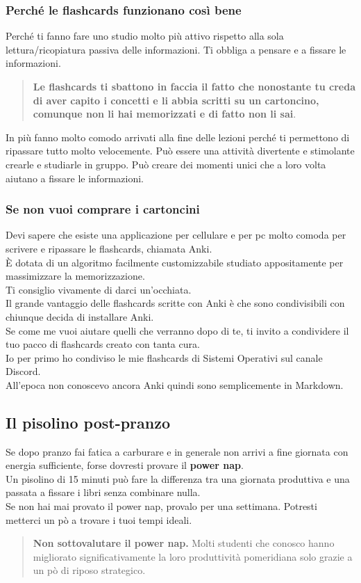 \documentclass[18pt]{extarticle}
\begin{document}
\subsubsection{Perché le flashcards funzionano così bene}
Perché ti fanno fare uno studio molto più attivo rispetto alla sola lettura/ricopiatura passiva delle informazioni.  
Ti obbliga a pensare e a fissare le informazioni.
\begin{quote}
\textbf{Le flashcards ti sbattono in faccia il fatto che nonostante tu creda di aver capito i concetti e li abbia scritti su un cartoncino, comunque non li hai memorizzati e di fatto non li sai}. 
\end{quote}
In più fanno molto comodo arrivati alla fine delle lezioni perché ti permettono di ripassare tutto molto velocemente.  
Può essere una attività divertente e stimolante crearle e studiarle in gruppo.  
Può creare dei momenti unici che a loro volta aiutano a fissare le informazioni. 


\subsubsection{Se non vuoi comprare i cartoncini}
Devi sapere che esiste una applicazione per cellulare e per pc molto comoda per scrivere e ripassare le flashcards, chiamata Anki.\\
È dotata di un algoritmo facilmente customizzabile studiato appositamente per massimizzare la memorizzazione.\\
Ti consiglio vivamente di darci un'occhiata.\\
Il grande vantaggio delle flashcards scritte con Anki è che sono condivisibili con chiunque decida di installare Anki.\\
Se come me vuoi aiutare quelli che verranno dopo di te, ti invito a condividere il tuo pacco di flashcards creato con tanta cura.\\
Io per primo ho condiviso le mie flashcards di Sistemi Operativi sul canale Discord.\\
All'epoca non conoscevo ancora Anki quindi sono semplicemente in Markdown.\\


\subsection{Il pisolino post-pranzo}
Se dopo pranzo fai fatica a carburare e in generale non arrivi a fine giornata con energia sufficiente, forse dovresti provare il \textbf{power nap}.\\
Un pisolino di 15 minuti può fare la differenza tra una giornata produttiva e una passata a fissare i libri senza combinare nulla.\\
Se non hai mai provato il power nap, provalo per una settimana. Potresti metterci un pò a trovare i tuoi tempi ideali.
\begin{quote}
\textbf{Non sottovalutare il power nap.} Molti studenti che conosco hanno migliorato significativamente la loro produttività pomeridiana solo grazie a un pò di riposo strategico.
\end{quote}
\end{document}
